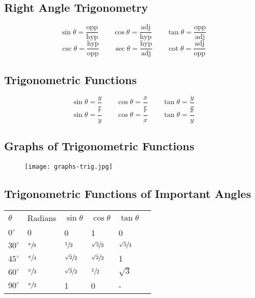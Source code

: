 \subsection{Right Angle Trigonometry}
\[
  \sin \theta = \frac{\text{opp}}{\text{hyp}} \qquad
  \cos \theta = \frac{\text{adj}}{\text{hyp}} \qquad
  \tan \theta = \frac{\text{opp}}{\text{adj}}
\]
\[
  \csc \theta = \frac{\text{hyp}}{\text{opp}} \qquad
  \sec \theta = \frac{\text{hyp}}{\text{adj}} \qquad
  \cot \theta = \frac{\text{adj}}{\text{opp}}
\]

\subsection{Trigonometric Functions}

\[
  \sin \theta = \frac yr \qquad
  \cos \theta = \frac xr \qquad
  \tan \theta = \frac yx
\]
\[
  \sin \theta = \frac ry \qquad
  \cos \theta = \frac rx \qquad
  \tan \theta = \frac xy
\]
  \begin{center}
  \end{center}

\subsection{Graphs of Trigonometric Functions}

\begin{figure}[h!]
    \centering
    \texttt{[image: graphs-trig.jpg]}
\end{figure}

\subsection{Trigonometric Functions of Important Angles}

\begin{center}
  \begin{tabular}{llllll}
    $\theta$ & Radians & $\sin \theta$ & $\cos \theta$ & $\tan \theta$\\[0.3cm]
    $0^{\circ}$ & $0$ & 0 & 1 & 0 \\[0.3cm]
    $30^{\circ}$ & $\sfrac{\pi}6$ & $\sfrac12$ & $\sfrac{\sqrt 3}2$ & $\sfrac{\sqrt 3}3$ \\[0.3cm]
    $45^{\circ}$ & $\sfrac{\pi}4$ & $\sfrac{\sqrt 2}2$ & $\sfrac{\sqrt 2}2$ & 1 \\[0.3cm]
    $60^{\circ}$ & $\sfrac{\pi}3$ & $\sfrac{\sqrt 3}2$ & $\sfrac12$ & $\sqrt 3$ \\[0.3cm]
    $90^{\circ}$ & $\sfrac{\pi}2$ & 1 & 0 & - \\[0.3cm]
  \end{tabular}
\end{center}

